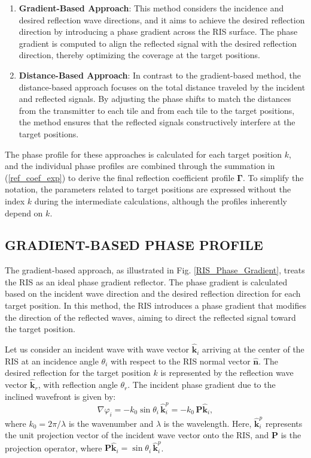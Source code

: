 \documentclass{IEEEoj}
\begin{document}
\begin{enumerate}
	\item \textbf{Gradient-Based Approach}: This method considers the incidence and desired reflection wave directions, and it aims to achieve the desired reflection direction by introducing a phase gradient across the RIS surface. The phase gradient is computed to align the reflected signal with the desired reflection direction, thereby optimizing the coverage at the target positions.
	
	\item \textbf{Distance-Based Approach}: In contrast to the gradient-based method, the distance-based approach focuses on the total distance traveled by the incident and reflected signals. By adjusting the phase shifts to match the distances from the transmitter to each tile and from each tile to the target positions, the method ensures that the reflected signals constructively interfere at the target positions.
\end{enumerate}

The phase profile for these approaches is calculated for each target position \( k \), and the individual phase profiles are combined through the summation in (\ref{ref_coef_exp}) to derive the final reflection coefficient profile \( \mathbf{\Gamma} \). To simplify the notation, the parameters related to target positions are expressed without the index \( k \) during the intermediate calculations, although the profiles inherently depend on \( k \).

\subsection{GRADIENT-BASED PHASE PROFILE}
The gradient-based approach, as illustrated in Fig. \ref{RIS_Phase_Gradient}, treats the RIS as an ideal phase gradient reflector. The phase gradient is calculated based on the incident wave direction and the desired reflection direction for each target position. In this method, the RIS introduces a phase gradient that modifies the direction of the reflected waves, aiming to direct the reflected signal toward the target position.

Let us consider an incident wave with wave vector \( \mathbf{\hat{k}}_i \) arriving at the center of the RIS at an incidence angle \( \theta_i \) with respect to the RIS normal vector \( \mathbf{\hat{n}} \). The desired reflection for the target position \( k \) is represented by the reflection wave vector \( \mathbf{\hat{k}}_r \), with reflection angle \( \theta_r \). The incident phase gradient due to the inclined wavefront is given by:
\[
\nabla \varphi_i = - k_0 \sin\theta_i \, \mathbf{\hat{k}}_i^p = - k_0 \, \textbf{P} \mathbf{\hat{k}}_i,
\]
where \( k_0 = 2 \pi / \lambda \) is the wavenumber and \( \lambda \) is the wavelength. Here, \( \mathbf{\hat{k}}_i^p \) represents the unit projection vector of the incident wave vector onto the RIS, and \( \textbf{P} \) is the projection operator, where \( \textbf{P} \mathbf{\hat{k}}_i = \sin\theta_i \, \mathbf{\hat{k}}_i^p \).
\end{document}
